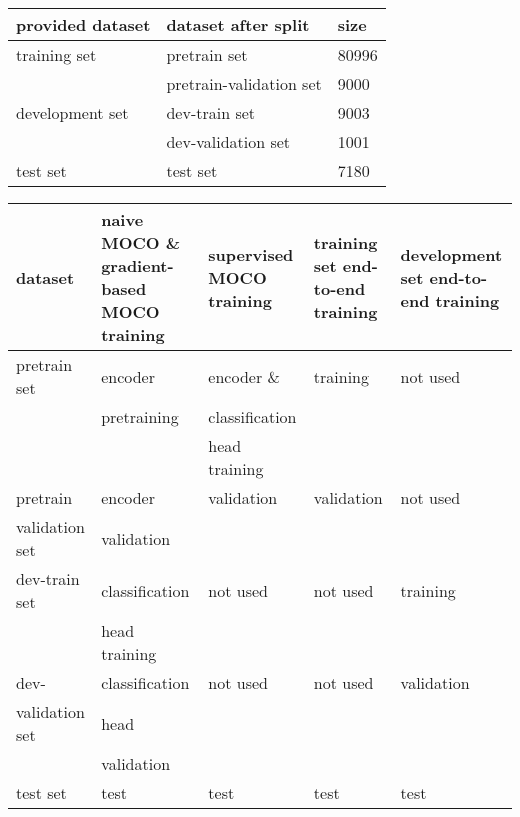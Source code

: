 \documentclass[12pt,twoside]{report}
\begin{document}
\begin{table}[]
    \centering
    \begin{tabular}{|l|l|l|}
    \toprule
    provided dataset & dataset after split & size \\
    \hline
    training set & pretrain set & 80996\\
                 & pretrain-validation set & 9000 \\
    \hline
    development set & dev-train set & 9003 \\
                 & dev-validation set & 1001 \\
    \hline
    test set     & test set & 7180 \\
    \bottomrule
    \end{tabular}
    \captionsetup{type=table}
    \label{tab:dataset_scale}
\end{table}

\begin{table}[]
    \centering
    \begin{tabular}{|p{2.5cm}|p{2.6cm}|p{2.5cm}|p{2.1cm}|p{2.3cm}|}
    \toprule
    dataset & naive MOCO \& gradient-based MOCO training & supervised MOCO training & training set end-to-end training & development set end-to-end training\\
    \hline
    pretrain set   & encoder        & encoder \&     & training   & not used \\
                   & pretraining    & classification &            &          \\
                   &                & head training  &            &          \\
    \hline
    pretrain       & encoder        & validation     & validation & not used \\
    validation set & validation     &                &            &          \\
    \hline
    dev-train set  & classification & not used       & not used   & training \\
                   & head training  &                &            &          \\
    \hline
    dev-           & classification & not used       & not used   & validation \\
    validation set & head           &                &            &            \\
                   & validation     &                &            &            \\
    \hline
    test set & test & test & test & test \\
    
    \bottomrule
    \end{tabular}
    \captionsetup{type=table}
    \label{tab:dataset_usage}
\end{table}
\end{document}
